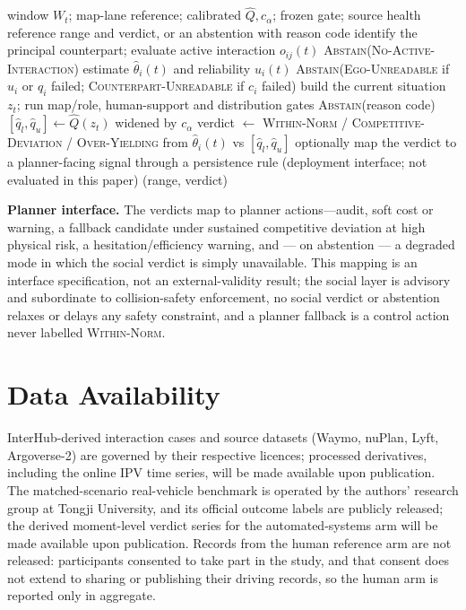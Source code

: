 \documentclass[12pt,a4paper]{article}
\begin{document}
\begin{algorithm}[t]
\caption{Online social-atypicality monitoring step at time $t$}
\label{alg:online}
\begin{algorithmic}[1]
\REQUIRE window $W_t$; map-lane reference; calibrated $\hat{Q},c_\alpha$; frozen gate; source health
\ENSURE reference range and verdict, or an abstention with reason code
\STATE identify the principal counterpart; evaluate active interaction $o_{ij}(t)$
 \RETURN \textsc{Abstain}(\textsc{No-Active-Interaction}) \ENDIF
\STATE estimate $\hat\theta_i(t)$ and reliability $u_i(t)$ 
 \RETURN \textsc{Abstain}(\textsc{Ego-Unreadable} if $u_i$ or $q_i$ failed; \textsc{Counterpart-Unreadable} if $c_i$ failed) \ENDIF
\STATE build the current situation $z_t$; run map/role, human-support and distribution gates
 \RETURN \textsc{Abstain}(reason code) \ENDIF
\STATE $[\hat q_l,\hat q_u]\leftarrow \hat{Q}(z_t)$ widened by $c_\alpha$
\STATE verdict $\leftarrow$ \textsc{Within-Norm} / \textsc{Competitive-Deviation} / \textsc{Over-Yielding} from $\hat\theta_i(t)$ vs $[\hat q_l,\hat q_u]$
\STATE optionally map the verdict to a planner-facing signal through a persistence rule (deployment interface; not evaluated in this paper)
\RETURN (range, verdict) 
\end{algorithmic}
\end{algorithm}

\noindent\textbf{Planner interface.} The verdicts map to planner actions---audit,
soft cost or warning, a fallback candidate under sustained competitive deviation at high physical
risk, a hesitation/efficiency warning, and --- on abstention --- a degraded mode in which the social verdict is simply unavailable. This mapping is an interface specification, not an external-validity result; the social layer is advisory and subordinate to collision-safety enforcement, no social verdict or abstention relaxes or delays any safety constraint, and a planner fallback is a control action never labelled \textsc{Within-Norm}.

\section*{Data Availability}
InterHub-derived interaction cases and source datasets (Waymo, nuPlan, Lyft, Argoverse-2) are governed
by their respective licences; processed derivatives, including the online IPV time series, will be made
available upon publication. The matched-scenario real-vehicle benchmark is operated by the authors'
research group at Tongji University, and its official outcome labels are publicly released; the
derived moment-level verdict series for the automated-systems arm will be made available upon
publication. Records from the human reference arm are not released: participants consented to take
part in the study, and that consent does not extend to sharing or publishing their driving records,
so the human arm is reported only in aggregate.
\end{document}
